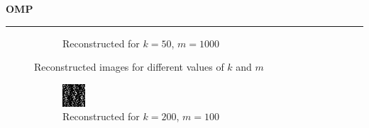 \documentclass[a4paper,12pt]{article}
\newenvironment{solution}[2][]{%
    \begin{mdframed}[linecolor=blue!70!black, linewidth=2pt, roundcorner=10pt, backgroundcolor=yellow!10!white, skipabove=12pt, skipbelow=12pt]%
        \textbf{\large #2}
        \par\noindent\rule{\textwidth}{0.4pt}
}{
    \end{mdframed}
}
\begin{document}
\begin{solution}{OMP}
\begin{figure}[H]
\begin{subfigure}[t]{0.23\textwidth}
        \caption{Reconstructed for $k = 50$, $m = 1000$}
    \end{subfigure}
  \caption{Reconstructed images for different values of $k$ and $m$}
  \label{fig:reconstructed_all}
\end{figure}

\begin{figure}[H]
    \centering
  \begin{subfigure}[t]{0.23\textwidth}
      \centering
      \includegraphics[width=\textwidth]{../images/omp/Reconstructed_k_200_m_100.png}
      \caption{Reconstructed for $k = 200$, $m = 100$}
  \end{subfigure}
    \begin{subfigure}[t]{0.23\textwidth}
        \centering

\end{subfigure}
\end{figure}
\end{solution}
\end{document}
